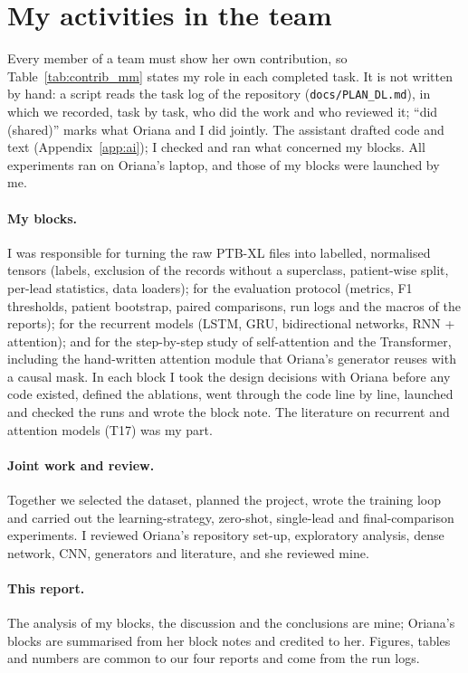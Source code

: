 \section{My activities in the team}\label{sec:activities}

Every member of a team must show her own contribution, so Table~\ref{tab:contrib_mm} states my role in
each completed task. It is not written by hand: a script reads the task log of the repository
(\texttt{docs/PLAN\_DL.md}), in which we recorded, task by task, who did the work and who reviewed it;
``did (shared)'' marks what Oriana and I did jointly. The assistant drafted code and text
(Appendix~\ref{app:ai}); I checked and ran what concerned my blocks. All experiments ran on Oriana's
laptop, and those of my blocks were launched by me.

\begin{table}[htbp]
\centering
\caption{My role in each completed task (generated from \texttt{docs/PLAN\_DL.md}).}
\label{tab:contrib_mm}

\end{table}

\paragraph{My blocks.} I was responsible for turning the raw PTB-XL files into labelled, normalised
tensors (labels, exclusion of the records without a superclass, patient-wise split, per-lead statistics,
data loaders); for the evaluation protocol (metrics, F1 thresholds, patient bootstrap, paired
comparisons, run logs and the macros of the reports); for the recurrent models (LSTM, GRU, bidirectional
networks, RNN + attention); and for the step-by-step study of self-attention and the Transformer,
including the hand-written attention module that Oriana's generator reuses with a causal mask. In each
block I took the design decisions with Oriana before any code existed, defined the ablations, went
through the code line by line, launched and checked the runs and wrote the block note. The literature on
recurrent and attention models (T17) was my part.

\paragraph{Joint work and review.} Together we selected the dataset, planned the project, wrote the
training loop and carried out the learning-strategy, zero-shot, single-lead and final-comparison
experiments. I reviewed Oriana's repository set-up, exploratory analysis, dense network, CNN, generators
and literature, and she reviewed mine.

\paragraph{This report.} The analysis of my blocks, the discussion and the conclusions are mine; Oriana's
blocks are summarised from her block notes and credited to her. Figures, tables and numbers are common to
our four reports and come from the run logs.
